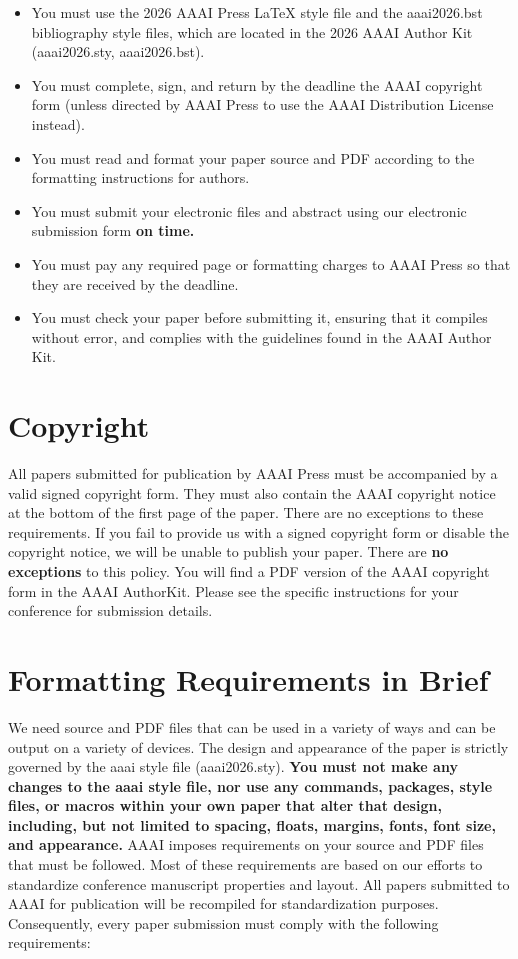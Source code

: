\documentclass[letterpaper]{article} %
\begin{document}
\begin{itemize}
\item You must use the 2026 AAAI Press \LaTeX{} style file and the aaai2026.bst bibliography style files, which are located in the 2026 AAAI Author Kit (aaai2026.sty, aaai2026.bst).
\item You must complete, sign, and return by the deadline the AAAI copyright form (unless directed by AAAI Press to use the AAAI Distribution License instead).
\item You must read and format your paper source and PDF according to the formatting instructions for authors.
\item You must submit your electronic files and abstract using our electronic submission form \textbf{on time.}
\item You must pay any required page or formatting charges to AAAI Press so that they are received by the deadline.
\item You must check your paper before submitting it, ensuring that it compiles without error, and complies with the guidelines found in the AAAI Author Kit.
\end{itemize}

\section{Copyright}
All papers submitted for publication by AAAI Press must be accompanied by a valid signed copyright form. They must also contain the AAAI copyright notice at the bottom of the first page of the paper. There are no exceptions to these requirements. If you fail to provide us with a signed copyright form or disable the copyright notice, we will be unable to publish your paper. There are \textbf{no exceptions} to this policy. You will find a PDF version of the AAAI copyright form in the AAAI AuthorKit. Please see the specific instructions for your conference for submission details.

\section{Formatting Requirements in Brief}
We need source and PDF files that can be used in a variety of ways and can be output on a variety of devices. The design and appearance of the paper is strictly governed by the aaai style file (aaai2026.sty).
\textbf{You must not make any changes to the aaai style file, nor use any commands, packages, style files, or macros within your own paper that alter that design, including, but not limited to spacing, floats, margins, fonts, font size, and appearance.} AAAI imposes requirements on your source and PDF files that must be followed. Most of these requirements are based on our efforts to standardize conference manuscript properties and layout. All papers submitted to AAAI for publication will be recompiled for standardization purposes. Consequently, every paper submission must comply with the following requirements:
\end{document}
